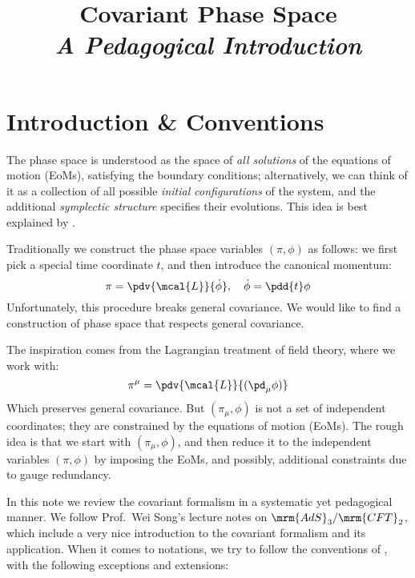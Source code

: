 \documentclass[a4paper
	,10pt
]{article}
\title{Covariant Phase Space\\[-.2ex]\large\it A Pedagogical Introduction}
\begin{document}
\maketitle
{}
\thispagestyle{empty}


\setlength{\parskip}{.1\baselineskip}
\tableofcontents
\setlength{\parskip}{\parskipnorm}

\addtocounter{section}{-1}
\section{Introduction \& Conventions}
	The phase space is understood as the space of \textit{all solutions} of the equations of motion (EoMs), satisfying the boundary conditions; alternatively, we can think of it as a collection of all possible \textit{initial configurations} of the system, and the additional \textit{symplectic structure} specifies their evolutions. This idea is best explained by \textcite{Crnkovic:1986ex}. 
	
	Traditionally we construct the phase space variables $(\pi,\phi)$ as follows: we first pick a special time coordinate $t$, and then introduce the canonical momentum:
	\begin{equation}
		\pi = \pdv{\mcal{L}}{\dot{\phi}},
	\quad
		\dot{\phi} = \pdd{t} \phi
	\end{equation}
	Unfortunately, this procedure breaks general covariance. We would like to find a construction of phase space that respects general covariance. 
	
	The inspiration comes from the Lagrangian treatment of field theory, where we work with:
	\begin{equation}
		\pi^\mu = \pdv{\mcal{L}}{(\pd_\mu\phi)}
	\end{equation}
	Which preserves general covariance. But $(\pi_\mu,\phi)$ is not a set of independent coordinates; they are constrained by the equations of motion (EoMs). The rough idea is that we start with $(\pi_\mu,\phi)$, and then reduce it to the independent variables $(\pi,\phi)$ by imposing the EoMs, and possibly, additional constraints due to gauge redundancy. 
	
	In this note we review the covariant formalism in a systematic yet pedagogical manner. 
	We follow Prof.~Wei Song's lecture notes on $\mrm{AdS}_3/\mrm{CFT}_2$, which include a very nice introduction to the covariant formalism and its application. 
	When it comes to notations, we try to follow the conventions of \textcite{Harlow:2019yfa}, with the following exceptions and extensions: 
	
\end{document}
